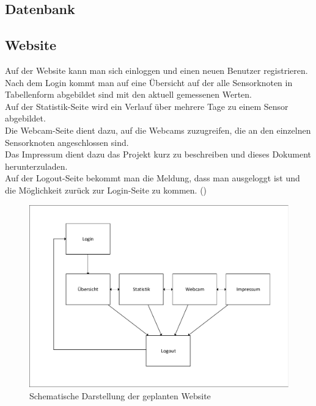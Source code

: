 \subsection{Datenbank}
\subsection{Website}

Auf der Website kann man sich einloggen und einen neuen Benutzer registrieren.
Nach dem Login kommt man auf eine Übersicht auf der alle Sensorknoten in
Tabellenform abgebildet sind mit den aktuell gemessenen Werten. \\
Auf der Statistik-Seite wird ein Verlauf über mehrere Tage zu einem Sensor
abgebildet.\\
Die Webcam-Seite dient dazu, auf die Webcams zuzugreifen, die an den einzelnen Sensorknoten
angeschlossen sind.\\
Das Impressum dient dazu das Projekt kurz zu beschreiben und dieses Dokument
herunterzuladen.\\
Auf der Logout-Seite bekommt man die Meldung, dass man ausgeloggt ist und die
Möglichkeit zurück zur Login-Seite zu kommen.
()


\begin{figure} [htb]
\begin{centering}
\includegraphics[scale=0.8]{Bilder/struktur_website_einfach.pdf}
\caption[Schematische Darstellung der geplanten Website]{Schematische
Darstellung der geplanten Website}
\label{Darstellung_Website_einfach}
\end{centering}
\end{figure}



